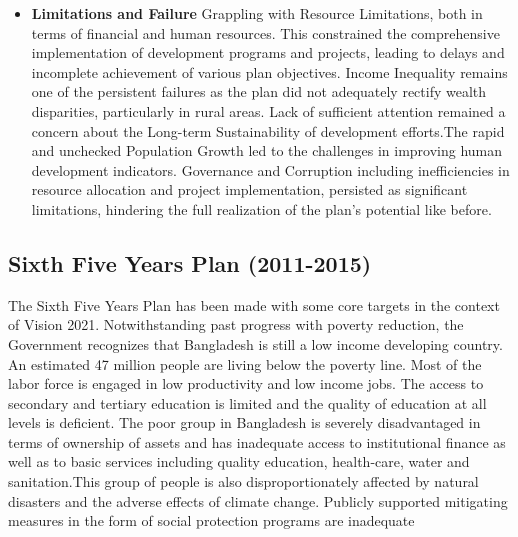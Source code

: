 \begin{itemize}
	\item\textbf{Limitations and Failure}
	Grappling with Resource Limitations, both in terms of financial and human resources. This constrained the 
	comprehensive implementation of development programs and projects, leading to delays and incomplete 
	achievement of various plan objectives. Income Inequality remains one of the persistent failures as 
	the plan did not adequately rectify wealth disparities, particularly in rural areas. Lack of sufficient 
	attention remained a concern about the Long-term Sustainability of development efforts.The rapid and 
	unchecked Population Growth led to the challenges in improving human development indicators. 
	Governance and Corruption including inefficiencies in resource allocation and project implementation, 
	persisted as significant limitations, hindering the full realization of the plan's potential like before.
\end{itemize}


\subsection{Sixth Five Years Plan (2011-2015)}
The Sixth Five Years Plan has been made with some core targets in the context of Vision
2021. Notwithstanding past progress with poverty reduction, the Government recognizes
that Bangladesh is still a low income developing country. An estimated 47 million people are
living below the poverty line. Most of the labor force is engaged in low productivity and
low income jobs. The access to secondary and tertiary education is limited and the quality of
education at all levels is deficient. The poor group in Bangladesh is severely disadvantaged
in terms of ownership of assets and has inadequate access to institutional finance as well
as to basic services including quality education, health-care, water and sanitation.This group
of people is also disproportionately affected by natural disasters and the adverse effects of
climate change. Publicly supported mitigating measures in the form of social protection
programs are inadequate

